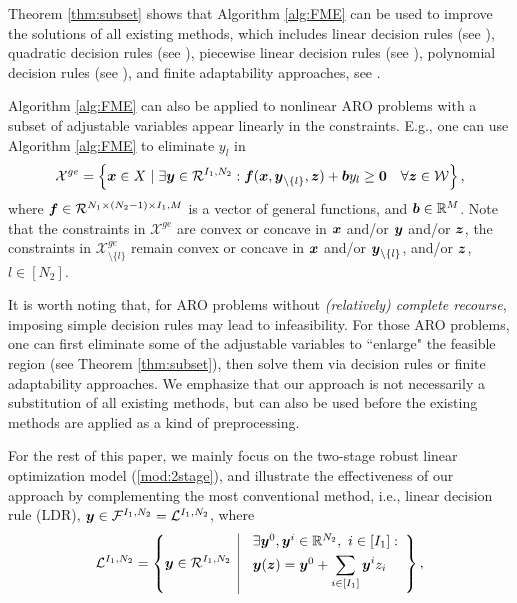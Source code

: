 \documentclass[fleqn,orsc,blindrev]{informs4}
\newcommand{\mb}[1]{\mbox{\boldmath \ensuremath{#1}}}
\begin{document}
 {Theorem \ref{thm:subset} shows that Algorithm \ref{alg:FME} can be used to improve the solutions of all existing methods, which includes linear decision rules (see \cite{bggn04,cz09}),  quadratic decision rules (see \cite{ben09}), piecewise linear decision rules (see \cite{cssz08,cz09,bg15}),  polynomial decision rules (see \cite{bip11}), and finite adaptability approaches, see \cite{bd16a,pd16}. 

Algorithm \ref{alg:FME} can also be applied to nonlinear ARO problems with a subset of adjustable variables appear linearly in the constraints. E.g., one can use Algorithm \ref{alg:FME} to eliminate $y_l$ in 
\begin{equation*}
	\mathcal{X}^{ge} = \left\{ \mb{x} \in X \hspace{3pt} | \hspace{3pt}  \exists \mb{y} \in \mathcal{R}^{I_1,N_2}: \mb{f}(\mb{x}, \mb{y}_{\setminus \{l\}}, \mb{z}) + \mb{b} y_l \geq \mb{0}  \quad  \forall \mb{z} \in \mathcal{W} \right\},
\end{equation*}
where $\mb{f} \in \mathcal{R}^{N_1\times (N_2-1)\times I_1, M}$ is a vector of general functions, and  $\mb{b} \in \mathbb{R}^{M}$. Note that the constraints in $\mathcal{X}^{ge}$ are convex or concave in $\mb{x}$ and/or $\mb{y}$ and/or $\mb{z}$, the constraints in $\mathcal{X}^{ge}_{\setminus \{l\}}$ remain convex or concave in $\mb{x}$ and/or $\mb{y}_{\setminus \{l\}}$, and/or $\mb{z}$, $l\in [N_2]$.  

 {It is worth noting that, for ARO problems without \textit{(relatively) complete recourse}, imposing simple decision rules may lead to infeasibility. For those ARO problems, one can first eliminate some of the adjustable variables to ``enlarge" the feasible region (see Theorem \ref{thm:subset}), then solve them via decision rules or finite adaptability approaches.} We emphasize that our approach is not necessarily a substitution of all existing methods, but can also be used before the existing methods are applied as a kind of preprocessing.}   For the rest of this paper, we mainly focus on the two-stage robust linear optimization model (\ref{mod:2stage}), and illustrate the effectiveness of our approach by complementing the most conventional method, i.e., linear decision rule (LDR), $\mb{y} \in \mathcal{F}^{I_1,N_2} = \mathcal{L}^{I_1,N_2}$, where
\begin{equation*}
\mathcal{L}^{I_1,N_2} =\left\{
\mb{y} \in \mathcal{R}^{I_1, N_2} \enskip \vline \enskip  \begin{array}{l}
\exists \mb{y}^0, \mb{y}^{i} \in \mathbb{R}^{N_2}, ~ i\in [I_1] :  \vspace{3pt}\\
\mb{y}(\mb{z}) = \mb{y}^0 + \displaystyle \sum_{i\in [I_1]}\mb{y}^{i} z_i \vspace{3pt}
\end{array}
\right\},
\end{equation*}
\end{document}
